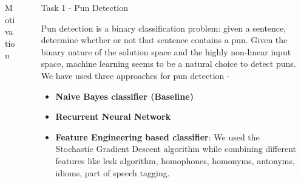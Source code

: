 \documentclass[final]{beamer}
\newlength{\sepwid}
\newlength{\onecolwid}
\newlength{\twocolwid}
\begin{document}
\begin{frame}[t]
\begin{columns}[t]
\begin{column}{\onecolwid}
\begin{block}{Motivation}
        \end{block}

    \end{column}

\begin{column}{\sepwid}\end{column} %

\begin{column}{\twocolwid} %

\begin{columns}[t,totalwidth=\twocolwid] %

\begin{column}{\onecolwid}\vspace{-.6in} %

    \begin{block}{Task 1 - Pun Detection}
        {\large Pun detection is a binary classification problem: given a sentence, determine whether or not that sentence contains a pun. Given the binary nature of the solution space and the highly non-linear input space, machine learning seems to be a natural choice to detect puns.\\
        We have used three approaches for pun detection - 
        \begin{itemize}
          \item {\textbf{Naive Bayes classifier (Baseline)}}
          \item {\textbf{Recurrent Neural Network}}
           \item {\textbf{Feature Engineering based classifier}: We used the Stochastic Gradient Descent algorithm while combining different features like lesk algorithm, homophones, homonyms, antonyms, idioms, part of speech tagging.}
        \end{itemize}
        }
      \end{block}




\end{column} %

\begin{column}{\onecolwid}\vspace{-.6in} %


\end{column}
\end{columns}
\end{column}
\end{columns}
\end{frame}
\end{document}
